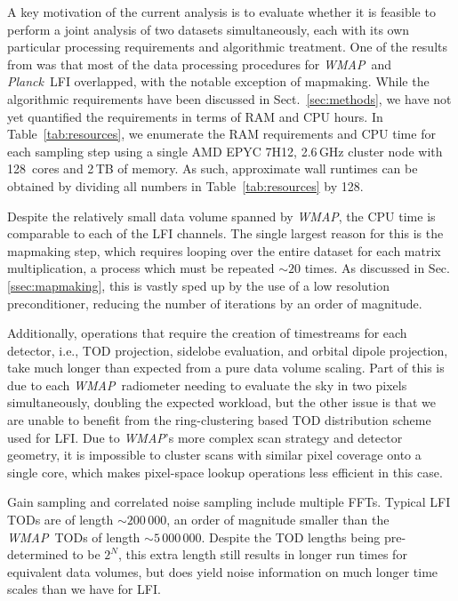 \documentclass[twocolumn]{../../common/aa}
\def\WMAP{\emph{WMAP}}
\def\Planck{\emph{Planck}}
\begin{document}
A key motivation of the current analysis is to evaluate whether it is feasible to perform a joint analysis of two datasets simultaneously, each with its own particular processing requirements and algorithmic treatment. One of the results from \citet{bp17} was that most of the data processing procedures for  \WMAP\ and \Planck\ LFI overlapped, with the notable exception of mapmaking. While the algorithmic requirements have been discussed in Sect.~\ref{sec:methods}, we have not yet quantified the requirements in terms of RAM and CPU hours. In Table~\ref{tab:resources}, we enumerate the RAM requirements and CPU time for each sampling step using a single AMD EPYC 7H12, 2.6\,GHz cluster node with 128~cores and 2\,TB of memory. As such, approximate wall runtimes can be obtained by dividing all numbers in Table~\ref{tab:resources} by 128.

Despite the relatively small data volume spanned by \WMAP, the CPU time is comparable to each of the LFI channels.  The single largest reason for this is the mapmaking step, which requires looping over the entire dataset for each matrix multiplication, a process which must be repeated $\sim20$ times. As discussed in Sec. \ref{ssec:mapmaking}, this is vastly sped up by the use of a low resolution preconditioner, reducing the number of iterations by an order of magnitude.


Additionally, operations that require the creation of  timestreams for each detector, i.e., TOD projection, sidelobe evaluation, and orbital dipole projection, take much longer than expected from a pure data volume scaling. Part of this is due to each \WMAP\ radiometer needing to evaluate the sky in two pixels simultaneously, doubling the expected workload, but the other issue is that we are unable to benefit from the ring-clustering based TOD distribution scheme used for LFI. Due to \WMAP's more complex scan strategy and detector geometry, it is impossible to cluster scans with similar pixel coverage onto a single core, which makes pixel-space lookup operations less efficient in this case.

Gain sampling and correlated noise sampling include multiple FFTs. Typical LFI TODs are of length $\sim200\,000$, an order of magnitude smaller than the \WMAP\ TODs of length $\sim5\,000\,000$. Despite the TOD lengths being pre-determined to be $2^N$, this extra length still results in longer run times for equivalent data volumes, but does yield noise information on much longer time scales than we have for LFI.  
\end{document}
